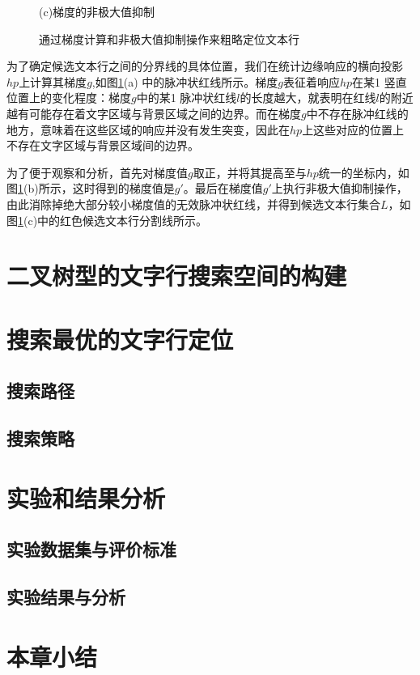 \begin{figure}[htbp]
\begin{minipage}[t]{0.32\linewidth}
        \centerline{\small (c)梯度的非极大值抑制}
        \end{minipage}
        \caption{通过梯度计算和非极大值抑制操作来粗略定位文本行}
        \label{fig.c4_candidate_line_construction}
        \end{figure}

        为了确定候选文本行之间的分界线的具体位置，我们在统计边缘响应的横向投影$hp$上计算其梯度$g$,如图\ref{fig.c4_candidate_line_construction}(a) 中的脉冲状红线所示。梯度$g$表征着响应$hp$在某1 竖直位置上的变化程度：梯度$g$中的某1 脉冲状红线$l$的长度越大，就表明在红线$l$的附近越有可能存在着文字区域与背景区域之间的边界。而在梯度$g$中不存在脉冲红线的地方，意味着在这些区域的响应并没有发生突变，因此在$hp$上这些对应的位置上不存在文字区域与背景区域间的边界。

        为了便于观察和分析，首先对梯度值$g$取正，并将其提高至与$hp$统一的坐标内，如图\ref{fig.c4_candidate_line_construction}(b)所示，这时得到的梯度值是$g$$'$。最后在梯度值$g$$'$上执行非极大值抑制操作，由此消除掉绝大部分较小梯度值的无效脉冲状红线，并得到候选文本行集合$L$，如图\ref{fig.c4_candidate_line_construction}(c)中的红色候选文本行分割线所示。

    \section{二叉树型的文字行搜索空间的构建}

    \section{搜索最优的文字行定位}

        \subsection{搜索路径}

        \subsection{搜索策略}

    \section{实验和结果分析}

        \subsection{实验数据集与评价标准}

        \subsection{实验结果与分析}

    \section{本章小结}



